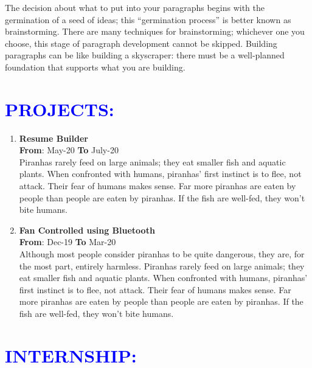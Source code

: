 \documentclass{article}
\begin{document}
\begin{multicols}{2}
\begin{flushleft}
The decision about what to put into your paragraphs begins with the germination of a seed of ideas; this “germination process” is better known as brainstorming. There are many techniques for brainstorming; whichever one you choose, this stage of paragraph development cannot be skipped. Building paragraphs can be like building a skyscraper: there must be a well-planned foundation that supports what you are building.
\end{flushleft}

\vspace{3pt}
\columnbreak

\section*{\large{\textcolor{blue}{\uppercase{projects:}}}}


\begin{enumerate}
	\item {\textbf{Resume Builder}}\\
	\hfill {\textbf{From}}: May-20 {\textbf{To}} July-20\\
	Piranhas rarely feed on large animals; they eat smaller fish and aquatic plants. When confronted with humans, piranhas’ first instinct is to flee, not attack. Their fear of humans makes sense. Far more piranhas are eaten by people than people are eaten by piranhas. If the fish are well-fed, they won’t bite humans.
	\item {\textbf{Fan Controlled using Bluetooth}}\\
	\hfill {\textbf{From}}: Dec-19 {\textbf{To}} Mar-20\\
	Although most people consider piranhas to be quite dangerous, they are, for the most part, entirely harmless. Piranhas rarely feed on large animals; they eat smaller fish and aquatic plants. When confronted with humans, piranhas’ first instinct is to flee, not attack. Their fear of humans makes sense. Far more piranhas are eaten by people than people are eaten by piranhas. If the fish are well-fed, they won’t bite humans.
\end{enumerate}

\vspace{5pt}

\section*{\large{\textcolor{blue}{\uppercase{Internship:}}}}


\end{multicols}
\end{document}
